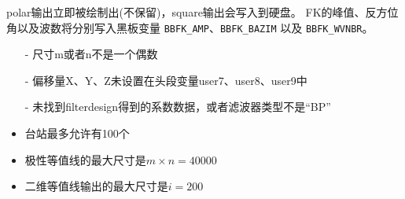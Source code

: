 polar输出立即被绘制出(不保留)，square输出会写入到硬盘。
FK的峰值、反方位角以及波数将分别写入黑板变量 \verb|BBFK_AMP|、\verb|BBFK_BAZIM| 以及
\verb|BBFK_WVNBR|。

\begin{itemize}
\item[-] 尺寸m或者n不是一个偶数
\item[-] 偏移量X、Y、Z未设置在头段变量user7、user8、user9中
\item[-] 未找到filterdesign得到的系数数据，或者滤波器类型不是``BP''
\end{itemize}

\begin{itemize}
\item 台站最多允许有100个
\item 极性等值线的最大尺寸是$m\times n = 40000$
\item 二维等值线输出的最大尺寸是$i = 200$
\end{itemize}


